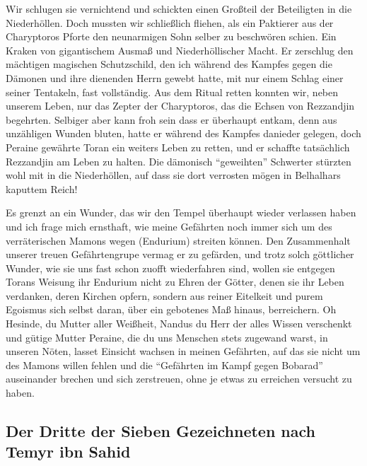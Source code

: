 Wir schlugen sie vernichtend und schickten einen Großteil der Beteiligten in die Niederhöllen. Doch mussten wir schließlich fliehen, als ein Paktierer aus der Charyptoros Pforte den neunarmigen Sohn selber zu beschwören schien. Ein Kraken von gigantischem Ausmaß und Niederhöllischer Macht. Er zerschlug den mächtigen magischen Schutzschild, den ich während des Kampfes gegen die Dämonen und ihre dienenden Herrn gewebt hatte, mit nur einem Schlag einer seiner Tentakeln, fast vollständig. Aus dem Ritual retten konnten wir, neben unserem Leben, nur das Zepter der Charyptoros, das die Echsen von Rezzandjin begehrten. Selbiger aber kann froh sein dass er überhaupt entkam, denn aus unzähligen Wunden bluten, hatte er während des Kampfes danieder gelegen, doch Peraine gewährte Toran ein weiters Leben zu retten, und er schaffte tatsächlich Rezzandjin am Leben zu halten.
Die dämonisch ``geweihten'' Schwerter stürzten wohl mit in die Niederhöllen, auf dass sie dort verrosten mögen in Belhalhars kaputtem Reich!

Es grenzt an ein Wunder, das wir den Tempel überhaupt wieder verlassen haben und ich frage mich ernsthaft, wie meine Gefährten noch immer sich um des verräterischen Mamons wegen (Endurium) streiten können. Den Zusammenhalt unserer treuen Gefährtengrupe vermag er zu gefärden, und trotz solch göttlicher Wunder, wie sie uns fast schon zuofft wiederfahren sind, wollen sie entgegen Torans Weisung ihr Endurium nicht zu Ehren der Götter, denen sie ihr Leben verdanken, deren Kirchen opfern, sondern aus reiner Eitelkeit und purem Egoismus sich selbst daran, über ein gebotenes Maß hinaus, berreichern. Oh Hesinde, du Mutter aller Weißheit, Nandus du Herr der alles Wissen verschenkt und gütige Mutter Peraine, die du uns Menschen stets zugewand warst, in unseren Nöten, lasset Einsicht wachsen in meinen Gefährten, auf das sie nicht um des Mamons willen fehlen und die ``Gefährten im Kampf gegen Bobarad'' auseinander brechen und sich zerstreuen, ohne je etwas zu erreichen versucht zu haben.

\subsection{Der Dritte der Sieben Gezeichneten nach Temyr ibn Sahid}

